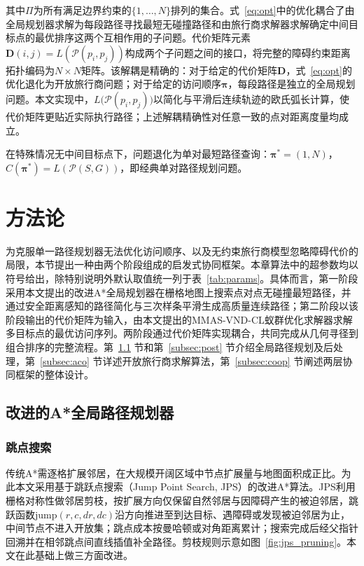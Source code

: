 \documentclass[lettersize,journal]{IEEEtran}
\begin{document}
其中$\Pi$为所有满足边界约束的$\{1, \dots, N\}$排列的集合。式~\textcolor{blue}{\eqref{eq:opt}}中的优化耦合了由全局规划器求解为每段路径寻找最短无碰撞路径和由旅行商求解器求解确定中间目标点的最优排序这两个互相作用的子问题。代价矩阵元素$\mathbf{D}(i, j) = L(\mathcal{P}(p_i, p_j))$构成两个子问题之间的接口，将完整的障碍约束距离拓扑编码为$N \times N$矩阵。该解耦是精确的：对于给定的代价矩阵$\mathbf{D}$，式~\textcolor{blue}{\eqref{eq:opt}}的优化退化为开放旅行商问题；对于给定的访问顺序$\bm{\pi}$，每段路径是独立的全局规划问题。本文实现中，$L\big(\mathcal{P}(p_i, p_j)\big)$以简化与平滑后连续轨迹的欧氏弧长计算，使代价矩阵更贴近实际执行路径；上述解耦精确性对任意一致的点对距离度量均成立。

在特殊情况无中间目标点下，问题退化为单对最短路径查询：$\bm{\pi}^{*} = (1, N)$，$C(\bm{\pi}^{*}) = L(\mathcal{P}(S, G))$，即经典单对路径规划问题。

\section{方法论}

\label{sec:method}

为克服单一路径规划器无法优化访问顺序、以及无约束旅行商模型忽略障碍代价的局限，本节提出一种由两个阶段组成的启发式协同框架。本章算法中的超参数均以符号给出，除特别说明外默认取值统一列于表~\textcolor{blue}{\ref{tab:params}}。具体而言，第一阶段采用本文提出的改进A*全局规划器在栅格地图上搜索点对点无碰撞最短路径，并通过安全距离感知的路径简化与三次样条平滑生成高质量连续路径；第二阶段以该阶段输出的代价矩阵为输入，由本文提出的MMAS-VND-CL蚁群优化求解器求解多目标点的最优访问序列。两阶段通过代价矩阵实现耦合，共同完成从几何寻径到组合排序的完整流程。第~\textcolor{blue}{\ref{subsec:jps}} 节和第~\textcolor{blue}{\ref{subsec:post}} 节介绍全局路径规划及后处理，第~\textcolor{blue}{\ref{subsec:aco}} 节详述开放旅行商求解算法，第~\textcolor{blue}{\ref{subsec:coop}} 节阐述两层协同框架的整体设计。

\subsection{改进的A*全局路径规划器}

\label{subsec:jps}

\subsubsection{跳点搜索}

传统A*需逐格扩展邻居，在大规模开阔区域中节点扩展量与地图面积成正比。为此本文采用基于跳跃点搜索（Jump Point Search, JPS）的改进A*算法\textcolor{blue}{\cite{ref11,ref12}}。JPS利用栅格对称性做邻居剪枝，按扩展方向仅保留自然邻居与因障碍产生的被迫邻居，跳跃函数$\mathrm{jump}(r, c, dr, dc)$沿方向推进至到达目标、遇障碍或发现被迫邻居为止，中间节点不进入开放集；跳点成本按曼哈顿或对角距离累计；搜索完成后经父指针回溯并在相邻跳点间直线插值补全路径。剪枝规则示意如图~\textcolor{blue}{\ref{fig:jps_pruning}}。本文在此基础上做三方面改进。
\end{document}
